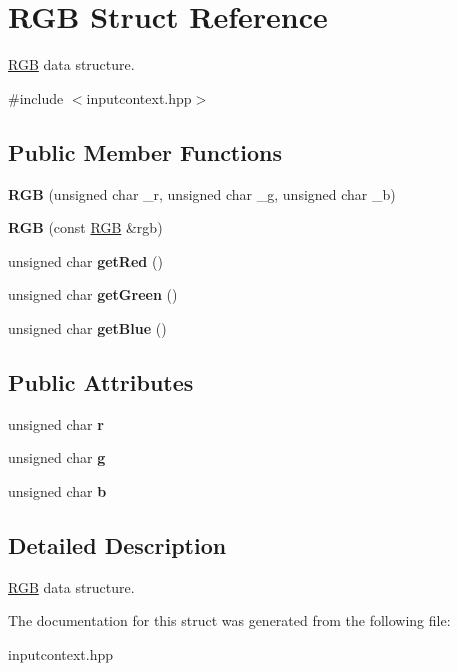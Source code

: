 \hypertarget{structRGB}{}\section{R\+GB Struct Reference}
\label{structRGB}


\hyperlink{structRGB}{R\+GB} data structure.  




{\ttfamily \#include $<$inputcontext.\+hpp$>$}

\subsection*{Public Member Functions}
\begin{DoxyCompactItemize}
\item 
\mbox{\label{structRGB_ae5c6f8e87d889304b591d841ed635ec9}} 
{\bfseries R\+GB} (unsigned char \+\_\+r, unsigned char \+\_\+g, unsigned char \+\_\+b)
\item 
\mbox{\label{structRGB_adf1461c8cdffc074a2e019dc9d1f3bc1}} 
{\bfseries R\+GB} (const \hyperlink{structRGB}{R\+GB} \&rgb)
\item 
\mbox{\label{structRGB_a4a5e452c99048fbf1c71e2983794a982}} 
unsigned char {\bfseries get\+Red} ()
\item 
\mbox{\label{structRGB_a1744e7db1a6f3f7aa527c7c892ac422b}} 
unsigned char {\bfseries get\+Green} ()
\item 
\mbox{\label{structRGB_a641b32101c60fc25ef1f91be5ae0264c}} 
unsigned char {\bfseries get\+Blue} ()
\end{DoxyCompactItemize}
\subsection*{Public Attributes}
\begin{DoxyCompactItemize}
\item 
\mbox{\label{structRGB_a8ea970fcd312802ef238733b1c9ed63d}} 
unsigned char {\bfseries r}
\item 
\mbox{\label{structRGB_a3595e9a2ed44c815153aff4e84e2d97c}} 
unsigned char {\bfseries g}
\item 
\mbox{\label{structRGB_ab2a3ac761d61594e2c51d65347a74017}} 
unsigned char {\bfseries b}
\end{DoxyCompactItemize}


\subsection{Detailed Description}
\hyperlink{structRGB}{R\+GB} data structure. 

The documentation for this struct was generated from the following file\+:\begin{DoxyCompactItemize}
\item 
inputcontext.\+hpp\end{DoxyCompactItemize}

